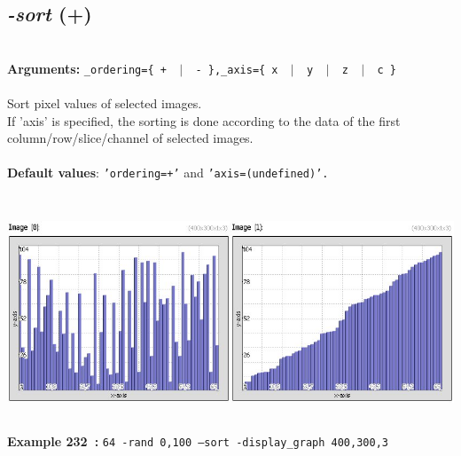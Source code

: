 \documentclass[a4paper,11pt,twoside]{book}
\begin{document}
\subsection{\emph{-sort} (+)}\vspace*{-0.5em}
~\\\textbf{Arguments: } 
{\small \texttt{\_ordering=\{ + ~$|$~ - \},\_axis=\{ x ~$|$~ y ~$|$~ z ~$|$~ c \}}}\\~\\
Sort pixel values of selected images.
~\\If 'axis' is specified, the sorting is done according to the data of the first column/row/slice/channel
of selected images.
~\\~\\\textbf{Default values}: {\small \texttt{'ordering=+'} and \texttt{'axis=(undefined)'.}}
\begin{center}\includegraphics[keepaspectratio=true,height=7cm,width=\textwidth]{img/gmic_def232.jpg}\\
{\footnotesize \textbf{Example 232~:} \texttt{64 -rand 0,100 --sort -display\_graph 400,300,3}}
\end{center}
\end{document}
